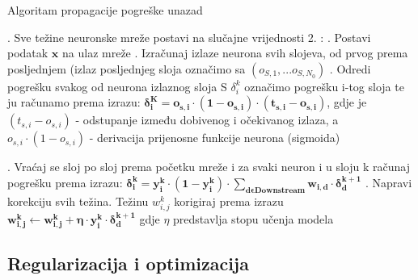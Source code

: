 \begin{algorithm}
  \caption{Algoritam propagacije pogreške unazad}


  
  \begin{algorithmic}
    . Sve težine neuronske mreže postavi na slučajne vrijednosti
      2. :
      \Repeat
            . Postavi podatak $\bm{x}$ na ulaz mreže
            . Izračunaj izlaze neurona svih slojeva, od prvog prema posljednjem
            \State \hspace{1em}(izlaz posljednjeg sloja označimo sa $(o_{S,1}, ... o_{S,N_{0}})$
            . Odredi pogrešku svakog od neurona izlaznog sloja
            \State \hspace{1em} S $\delta ^{k}_{i}$ označimo pogrešku i-tog sloja te ju računamo prema izrazu:
            \State \hspace{1em} $\bm{\delta ^{K}_{i}  = o_{s,i} \cdot (1-o_{s,i}) \cdot (t_{s,i}-o_{s,i})}$, gdje je
            \State \hspace{1em} $(t_{s,i}-o_{s,i})$ - odstupanje između dobivenog i očekivanog izlaza, a
            \State \hspace{1em} $o_{s,i} \cdot (1-o_{s,i})$ - derivacija prijenosne funkcije neurona (sigmoida)
            
            . Vraćaj se sloj po sloj prema početku mreže i za svaki neuron i
            \State \hspace{1em} u sloju k računaj pogrešku prema izrazu:
            \State \hspace{1em} $\bm{\delta ^{k}_{i}  = y^{k}_{i} \cdot (1-y^{k}_{i}) \cdot   \sum\limits_{d \epsilon Downstream}^{} w_{i,d} \cdot \delta ^{k+1}_{d}}$
            . Napravi korekciju svih težina. Težinu $w^{k}_{i,j}$ korigiraj prema izrazu
            \State \hspace{1em} $\bm{w^{k}_{i,j}  \leftarrow w^{k}_{i,j} +  \eta \cdot y^{k}_{i} \cdot  \delta^{k+1}_{d}}$
            \State \hspace{1em} gdje $\eta$ predstavlja stopu učenja modela
        \EndFor
      \EndWhile
  \end{algorithmic}
\end{algorithm}

\subsection{Regularizacija i optimizacija}

